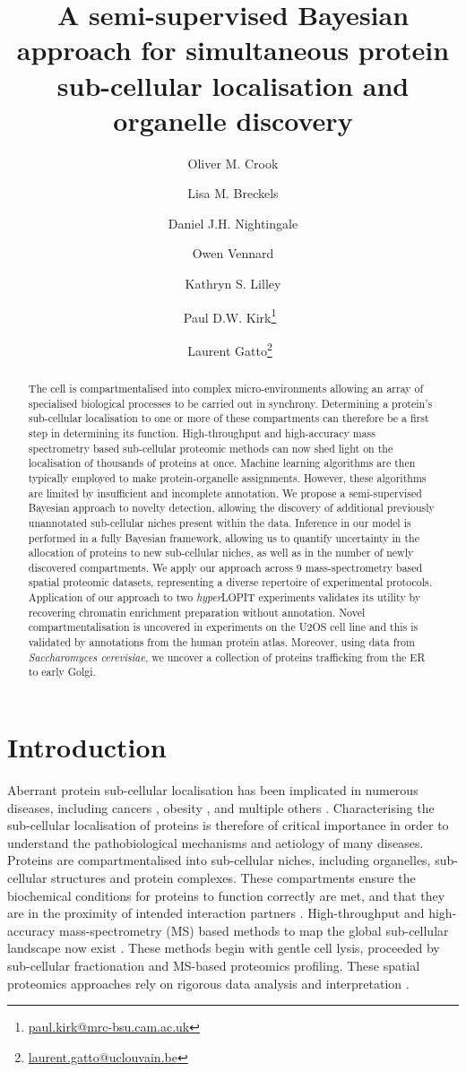 \documentclass[12pt,english]{article}
\title{A semi-supervised Bayesian approach for simultaneous protein sub-cellular localisation and organelle discovery }
\author[1,2,3]{Oliver M. Crook}
\author[1,2]{Lisa M. Breckels}
\author[2]{Daniel J.H. Nightingale}
\author[2]{Owen Vennard}
\author[2]{Kathryn S. Lilley}
\author[3]{Paul D.W. Kirk\thanks{\url{paul.kirk@mrc-bsu.cam.ac.uk}}~}
\author[4]{Laurent Gatto\thanks{\url{laurent.gatto@uclouvain.be}}~}
\affil[1]{Computational Proteomics Unit, Department of
	Biochemistry, University of Cambridge, Cambridge, UK}
\affil[2]{Cambridge Centre for Proteomics, Department of Biochemistry,
	University of Cambridge, Cambridge, UK}
\affil[3]{MRC Biostatistics Unit, Cambridge Institute for Public
	Health, Cambridge, UK}
\affil[4]{de Duve Institute, UCLouvain, Avenue
	Hippocrate 75, 1200 Brussels, Belgium}
\begin{document}
\maketitle

\begin{abstract}
The cell is compartmentalised into complex micro-environments allowing an array of
specialised biological processes to be carried out in synchrony. Determining a protein's sub-cellular localisation to one or more of these compartments can therefore be a first step in determining its function. High-throughput and high-accuracy mass spectrometry based sub-cellular proteomic methods can now shed light on the localisation of thousands of proteins at once. Machine learning algorithms are then typically employed to make protein-organelle assignments. However, these algorithms are limited by insufficient and incomplete annotation. We propose a semi-supervised Bayesian approach to novelty detection, allowing the discovery of additional previously unannotated sub-cellular niches present within the data. Inference in our model is performed in a fully Bayesian framework, allowing us to quantify uncertainty in the allocation of proteins to new sub-cellular niches, as well as in the number of newly discovered compartments. We apply our approach across $9$ mass-spectrometry based spatial proteomic datasets, representing a diverse repertoire of experimental protocols. Application of our approach to two \textit{hyper}LOPIT experiments validates its utility by recovering chromatin enrichment preparation without annotation. Novel compartmentalisation is uncovered in experiments on the U2OS cell line and this is validated by annotations from the human protein atlas. Moreover, using data from \textit{Saccharomyces cerevisiae}, we uncover a collection of proteins trafficking from the ER to early Golgi.
\end{abstract}
\clearpage
\section{Introduction}
Aberrant protein sub-cellular localisation has been implicated in numerous diseases, including cancers \citep{Kau:2004}, obesity \citep{Siljee:2018}, and multiple others \citep{Laurila:2009}. Characterising the sub-cellular localisation of proteins is therefore of critical importance in order to understand the pathobiological mechanisms and aetiology of many diseases. Proteins are compartmentalised into sub-cellular niches, including organelles, sub-cellular structures and protein complexes. These compartments ensure the biochemical conditions for proteins to function correctly are met, and that they are in the proximity of intended interaction partners \citep{Gibson:2009}. High-throughput and high-accuracy mass-spectrometry (MS) based methods to map the global sub-cellular landscape now exist \citep{hyper, Mulvey:2017, DC:2018}. These methods begin with gentle cell lysis, proceeded by sub-cellular fractionation and MS-based proteomics profiling. These spatial proteomics approaches rely on rigorous data analysis and interpretation \citep{Gatto:2010, Gatto:2014b}.
\end{document}
